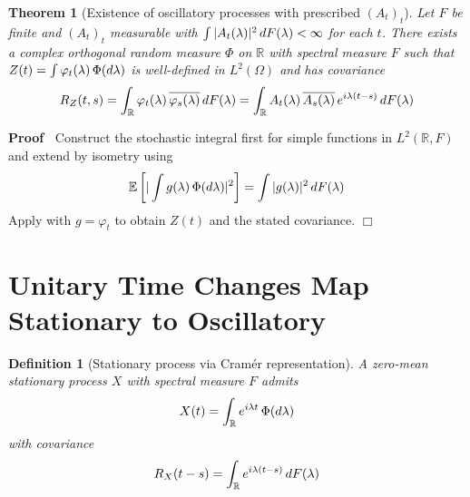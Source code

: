 \documentclass{article}
\newenvironment{proof}{\noindent\textbf{Proof\ }}{\hspace*{\fill}$\Box$\medskip}
\newtheorem{definition}{Definition}
\newtheorem{theorem}{Theorem}
\begin{document}
\begin{theorem}
  [Existence of oscillatory processes with prescribed $(A_t)_t$] Let $F$ be
  finite and $(A_t)_t$ measurable with $\int |A_t (\lambda) |^2 
  \hspace{0.17em} dF (\lambda) < \infty$ for each $t$. There exists a complex
  orthogonal random measure $\Phi$ on $\mathbb{R}$ with spectral measure $F$
  such that $Z (t) = \int \varphi_t (\lambda)  \hspace{0.17em} \Phi (d
  \lambda)$ is well-defined in $L^2 (\Omega)$ and has covariance
  \begin{equation}
    R_Z (t, s) = \int_{\mathbb{R}} \varphi_t (\lambda) \hspace{0.17em}
    \overline{\varphi_s (\lambda)} \hspace{0.17em} dF (\lambda) =
    \int_{\mathbb{R}} A_t (\lambda) \hspace{0.17em} \overline{A_s (\lambda)}
    \hspace{0.17em} e^{i \lambda (t - s)}  \hspace{0.17em} dF (\lambda)
  \end{equation}
\end{theorem}

\begin{proof}
  Construct the stochastic integral first for simple functions in $L^2 
  (\mathbb{R}, F)$ and extend by isometry using
  \begin{equation}
    \mathbb{E} \left[ | \int g (\lambda) \hspace{0.17em} \Phi (d \lambda) |^2
    \right] = \int |g (\lambda) |^2  \hspace{0.17em} dF (\lambda)
  \end{equation}
  Apply with $g = \varphi_t$ to obtain $Z (t)$ and the stated covariance.
\end{proof}

\section{Unitary Time Changes Map Stationary to Oscillatory}

\begin{definition}
  [Stationary process via Cram{\'e}r representation] A zero-mean stationary
  process $X$ with spectral measure $F$ admits
  \begin{equation}
    X (t) = \int_{\mathbb{R}} e^{i \lambda t}  \hspace{0.17em} \Phi (d
    \lambda)
  \end{equation}
  with covariance
  \begin{equation}
    R_X  (t - s) = \int_{\mathbb{R}} e^{i \lambda (t - s)}  \hspace{0.17em} dF
    (\lambda)
  \end{equation}
\end{definition}
\end{document}
